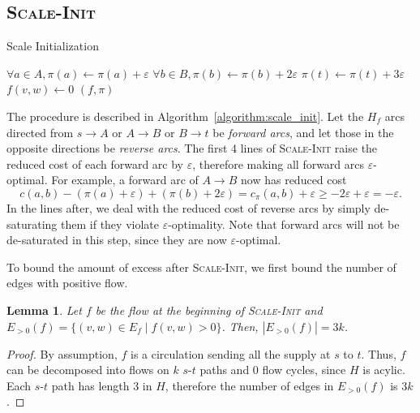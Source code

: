 \documentclass[11pt]{article}
\def\eps{\varepsilon}
\theoremstyle{plain}
\newtheorem{lemma}{Lemma}
\begin{document}
\subsection{\textsc{Scale-Init}}

\begin{algorithm}
\caption{Scale Initialization}
\label{algorithm:scale_init}
\begin{algorithmic}[1]
	\State $\forall a \in A, \pi(a) \gets \pi(a) + \eps$
	\State $\forall b \in B, \pi(b) \gets \pi(b) + 2\eps$
	\State $\pi(t) \gets \pi(t) + 3\eps$
	\Statex %
		\If{$c_\pi(w, v) < -\eps$}
			\State $f(v, w) \gets 0$
		\EndIf
	\EndFor
	\State\Return $(f, \pi)$
\EndFunction
\end{algorithmic}
\end{algorithm}

The procedure is described in Algorithm~\ref{algorithm:scale_init}.
Let the $H_f$ arcs directed from $s \to A$ or $A \to B$ or $B \to t$ be
\emph{forward arcs}, and let those in the opposite directions be
\emph{reverse arcs}.
The first 4 lines of \textsc{Scale-Init} raise the reduced cost of each
forward arc by $\eps$, therefore making all forward arcs $\eps$-optimal.
For example, a forward arc of $A \to B$ now has reduced cost
\begin{equation*}
	c(a, b) - (\pi(a) + \eps) + (\pi(b) + 2\eps)
	= c_\pi(a, b) + \eps
	\geq -2\eps + \eps
	= -\eps.
\end{equation*}
In the lines after, we deal with the reduced cost of reverse arcs by simply
de-saturating them if they violate $\eps$-optimality.
Note that forward arcs will not be de-saturated in this step, since they are
now $\eps$-optimal.

To bound the amount of excess after \textsc{Scale-Init}, we first bound the
number of edges with positive flow.
\begin{lemma}
\label{lemma:support_size_start}
Let $f$ be the flow at the beginning of \textsc{Scale-Init} and
$E_{>0}(f) = \{(v, w) \in E_f \mid f(v, w) > 0\}$.
Then, $|E_{>0}(f)| = 3k$.
\end{lemma}

\begin{proof}
By assumption, $f$ is a circulation sending all the supply at $s$ to $t$. 
Thus, $f$ can be decomposed into flows on $k$ $s$-$t$ paths and 0 flow cycles, 
since $H$ is acylic.
Each $s$-$t$ path has length 3 in $H$, therefore the number of edges in 
$E_{>0}(f)$ is $3k$.
\end{proof}
\end{document}
